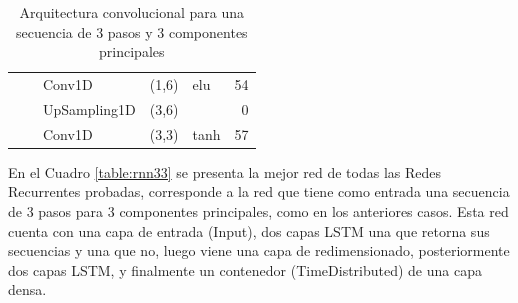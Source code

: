 \begin{table}[H]
\begin{center}
\begin{tabular}{ll|l|r|l|r|}
\multicolumn{1}{|l|}{}                              &                             & Conv1D                             & (1,6)                                & elu                                     & 54                                          \\ \cline{3-6} 
\multicolumn{1}{|l|}{}                              &                             & UpSampling1D                       & (3,6)                                &                                          & 0                                           \\ \cline{3-6} 
\multicolumn{1}{|l|}{}                              &                             & Conv1D                             & \multicolumn{1}{l|}{(3,3)}           & tanh                                     & 57                                          \\ \hline
\end{tabular}
\end{center}
\caption{Arquitectura convolucional para una secuencia de 3 pasos y 3 componentes principales}
\label{table:cnn33}
\end{table}


En el Cuadro \ref{table:rnn33} se presenta la mejor red de todas las Redes Recurrentes probadas, corresponde a la red que tiene como entrada una secuencia de 3 pasos para 3 componentes principales, como en los anteriores casos. Esta red cuenta con una capa de entrada (Input), dos capas LSTM una que retorna sus secuencias y una que no, luego viene una capa de redimensionado, posteriormente dos capas LSTM, y finalmente un contenedor  (TimeDistributed) de una capa densa.

